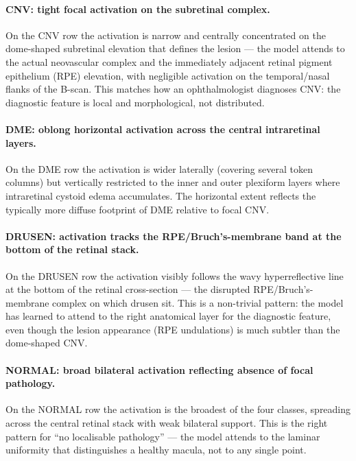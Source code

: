 \documentclass[5p]{elsarticle}
\begin{document}
\paragraph{CNV: tight focal activation on the subretinal complex.}
On the CNV row the activation is narrow and centrally concentrated on the dome-shaped subretinal elevation that defines the lesion --- the model attends to the actual neovascular complex and the immediately adjacent retinal pigment epithelium (RPE) elevation, with negligible activation on the temporal/nasal flanks of the B-scan. This matches how an ophthalmologist diagnoses CNV: the diagnostic feature is local and morphological, not distributed.

\paragraph{DME: oblong horizontal activation across the central intraretinal layers.}
On the DME row the activation is wider laterally (covering several token columns) but vertically restricted to the inner and outer plexiform layers where intraretinal cystoid edema accumulates. The horizontal extent reflects the typically more diffuse footprint of DME relative to focal CNV.

\paragraph{DRUSEN: activation tracks the RPE/Bruch's-membrane band at the bottom of the retinal stack.}
On the DRUSEN row the activation visibly follows the wavy hyperreflective line at the bottom of the retinal cross-section --- the disrupted RPE/Bruch's-membrane complex on which drusen sit. This is a non-trivial pattern: the model has learned to attend to the right anatomical layer for the diagnostic feature, even though the lesion appearance (RPE undulations) is much subtler than the dome-shaped CNV.

\paragraph{NORMAL: broad bilateral activation reflecting absence of focal pathology.}
On the NORMAL row the activation is the broadest of the four classes, spreading across the central retinal stack with weak bilateral support. This is the right pattern for ``no localisable pathology'' --- the model attends to the laminar uniformity that distinguishes a healthy macula, not to any single point.
\end{document}

